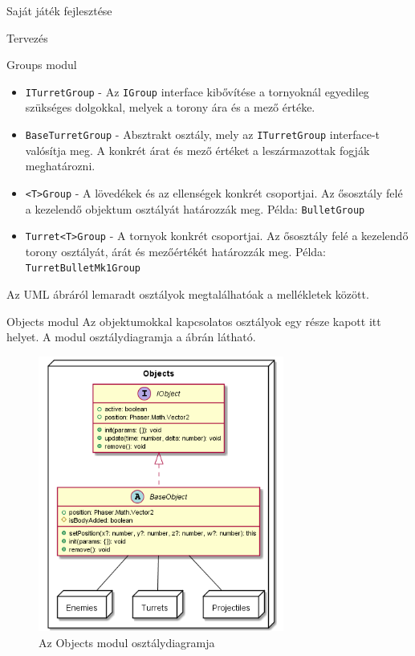 \begin{MyChapter}{Saját játék fejlesztése}
\begin{MySection}{Tervezés}
\begin{MySubSection}{Groups modul}
\begin{itemize}
				\item \texttt{ITurretGroup} - Az \texttt{IGroup} interface kibővítése a tornyoknál egyedileg szükséges dolgokkal, melyek a torony ára és a mező értéke.
				
				\item \texttt{BaseTurretGroup} - Absztrakt osztály, mely az \texttt{ITurretGroup} interface-t valósítja meg. A konkrét árat és mező értéket a leszármazottak fogják meghatározni.
				
				\item \texttt{<T>Group} - A lövedékek és az ellenségek konkrét csoportjai. Az ősosztály felé a kezelendő objektum osztályát határozzák meg. Példa: \texttt{BulletGroup}
				
				\item \texttt{Turret<T>Group} - A tornyok konkrét csoportjai. Az ősosztály felé a kezelendő torony osztályát, árát és mezőértékét határozzák meg. Példa: \texttt{Turret\-Bullet\-Mk1\-Group}
			\end{itemize}
			
			Az UML ábráról lemaradt osztályok megtalálhatóak a mellékletek között.
		\end{MySubSection}
	
		\begin{MySubSection}{Objects modul}
			Az objektumokkal kapcsolatos osztályok egy része kapott itt helyet.
			A modul osztálydiagramja a  ábrán látható.
			
			\begin{figure}[H]
				\centering
				\includegraphics[width=0.72\textwidth]{kepek/uml/objects/object.png}
				\caption{Az Objects modul osztálydiagramja}
				\label{fig:uml:object}
			\end{figure}
			

\end{MySubSection}
\end{MySection}
\end{MyChapter}
